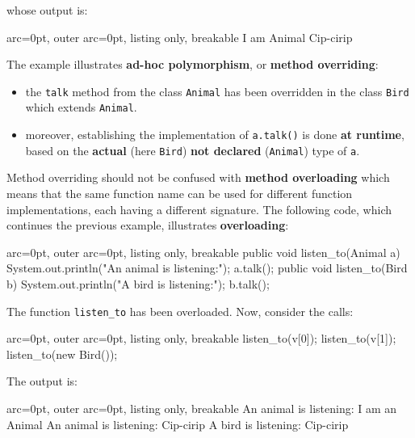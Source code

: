 whose output is:

\begin{tcblisting}{ arc=0pt, outer arc=0pt, listing only, breakable}
I am Animal
Cip-cirip

\end{tcblisting}


The example illustrates \textbf{ad-hoc polymorphism}, or \textbf{method overriding}:
\begin{itemize}
	\item  the \texttt{talk} method from the class \texttt{Animal} has been overridden in the class \texttt{Bird} which extends \texttt{Animal}.
	\item  moreover, establishing the implementation of \texttt{a.talk()} is done \textbf{at runtime}, based on the \textbf{actual} (here \texttt{Bird}) \textbf{not declared} (\texttt{Animal}) type of \texttt{a}.
\end{itemize}

Method overriding should not be confused with \textbf{method overloading} which means that the same function name can be used for different function implementations, each having a different signature. The following code, which continues the previous example, illustrates \textbf{overloading}:


\begin{tcblisting}{ arc=0pt, outer arc=0pt, listing only, breakable}
  public void listen_to(Animal a){
    System.out.println("An animal is listening:");
    a.talk();
  }
  public void listen_to(Bird b){
    System.out.println("A bird is listening:");
    b.talk();
  }

\end{tcblisting}

The function \texttt{listen\_to} has been overloaded. Now, consider the calls:

\begin{tcblisting}{ arc=0pt, outer arc=0pt, listing only, breakable}
listen_to(v[0]);
listen_to(v[1]); 
listen_to(new Bird());

\end{tcblisting}


The output is:

\begin{tcblisting}{ arc=0pt, outer arc=0pt, listing only, breakable}
An animal is listening:
I am an Animal
An animal is listening:
Cip-cirip
A bird is listening:
Cip-cirip

\end{tcblisting}


